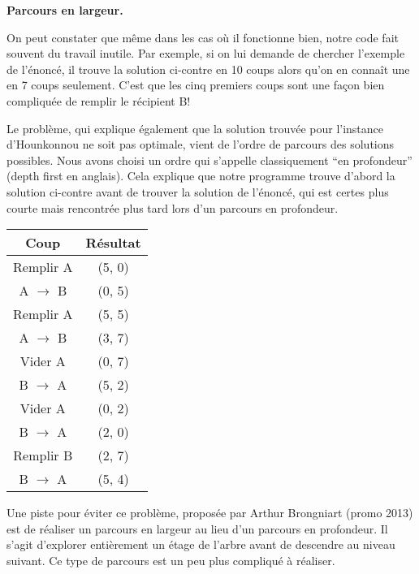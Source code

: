 \documentclass[10pt]{article}\usepackage[correction,nu]{esial}%
\begin{document}
\begin{Exercice}\textbf{Parcours en largeur.}

\noindent
\begin{minipage}{.74\linewidth}
  On peut constater que même dans les cas où il fonctionne bien, notre code fait
  souvent du travail inutile. Par exemple, si on lui demande de chercher
  l'exemple de l'énoncé, il trouve la solution ci-contre en 10 coups alors qu'on
  en connaît une en 7 coups seulement. C'est que les cinq premiers coups sont
  une façon bien compliquée de remplir le récipient B!

  Le problème, qui explique également que la solution trouvée pour l'instance
  d'Hounkonnou ne soit pas optimale, vient de l'ordre de parcours des solutions
  possibles. Nous avons choisi un ordre qui s'appelle classiquement ``en
  profondeur'' (depth first en anglais). Cela explique que notre programme
  trouve d'abord la solution ci-contre avant de trouver la solution de l'énoncé,
  qui est certes plus courte mais rencontrée plus tard lors d'un parcours en
  profondeur.
\end{minipage}\hfill\begin{minipage}{.24\linewidth}
  \begin{tabular}{|c|c|}\hline
    Coup&Résultat\\\hline
    Remplir A         & (5, 0)\\\hline
    A $\rightarrow$ B & (0, 5)\\\hline
    Remplir A         & (5, 5)\\\hline
    A $\rightarrow$ B & (3, 7)\\\hline
    Vider A           & (0, 7)\\\hline
    B $\rightarrow$ A & (5, 2)\\\hline
    Vider A           & (0, 2)\\\hline
    B $\rightarrow$ A & (2, 0)\\\hline
    Remplir B         & (2, 7)\\\hline
    B $\rightarrow$ A & (5, 4)\\\hline
  \end{tabular}
\end{minipage}

Une piste pour éviter ce problème, proposée par Arthur Brongniart (promo 2013)
est de réaliser un parcours en largeur au lieu d'un parcours en profondeur.  Il
s'agit d'explorer entièrement un étage de l'arbre avant de descendre au niveau
suivant. Ce type de parcours est un peu plus compliqué à réaliser.


\end{Exercice}
\end{document}
